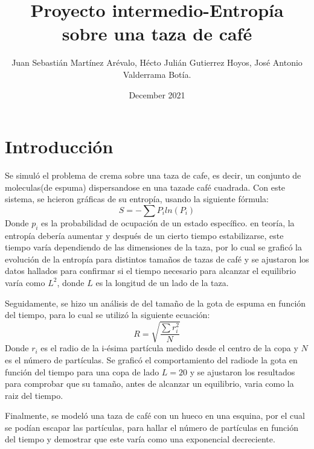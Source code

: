 \documentclass{article}
\title{Proyecto intermedio-Entropía sobre una taza de café}
\author{Juan Sebastián Martínez Arévalo, Hécto Julián Gutierrez Hoyos, José Antonio Valderrama Botía. }
\date{December 2021}
\begin{document}
\maketitle

\section{Introducción}
Se simuló el problema de crema sobre una taza de cafe, es decir, un conjunto de moleculas(de espuma) dispersandose en una tazade café cuadrada. Con este sistema, se hcieron gráficas de su entropía, usando la siguiente fórmula:
\begin{equation}
    S=-\sum{P_{i}ln(P_{i})}
    \label{eqentropia}
\end{equation}
Donde $p_{i}$ es la probabilidad de ocupación de un estado específico. en teoría, la entropía debería aumentar y después de un cierto tiempo estabilizarse, este tiempo varía dependiendo de las dimensiones de la taza, por lo cual se graficó la evolución de la entropía para distintos tamaños de tazas de café y se ajustaron los datos hallados para confirmar si el tiempo necesario para alcanzar el equilibrio varía como $L^{2}$, donde $L$ es la longitud de un lado de la taza.\par

Seguidamente, se hizo un análisis de del tamaño de la gota de espuma en función del tiempo, para lo cual se utilizó la siguiente ecuación:
\begin{equation}
    R=\sqrt{\frac{\sum{r_{i}^{2}}}{N}}
    \label{eqradio}
\end{equation}
Donde $r_{i}$ es el radio de la i-ésima partícula medido desde el centro de la copa y $N$ es el número de partículas. Se graficó el comportamiento del radiode la gota en función del tiempo para una copa de lado $L=20$ y se ajustaron los resultados para comprobar que su tamaño, antes de alcanzar un equilibrio, varia como la raiz del tiempo.\par

Finalmente, se modeló una taza de café con un hueco en una esquina, por el cual se podían escapar las partículas, para hallar el número de partículas en función del tiempo y demostrar que este varía como una exponencial decreciente.
\end{document}
